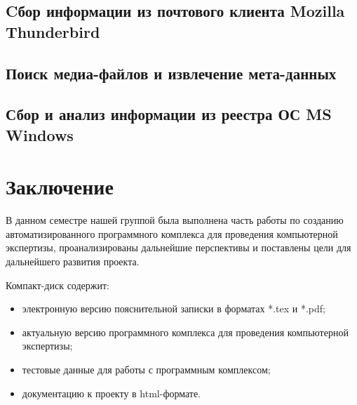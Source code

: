 \newpage
\subsection{Cбор информации из почтового клиента Mozilla Thunderbird}  %


\newpage
\subsection{Поиск медиа-файлов и извлечение мета-данных} %


\newpage 
\subsection{Сбор и анализ информации из реестра ОС MS Windows} %


\newpage
\section*{Заключение}
В данном семестре нашей группой была выполнена часть работы по созданию автоматизированного программного комплекса для проведения компьютерной экспертизы, проанализированы дальнейшие перспективы и поставлены цели для дальнейшего развития проекта.
 
 
 \newpage
 \renewcommand{\refname}{Список использованных источников}
 

 Компакт-диск содержит: 
 \begin{itemize}
 \item электронную версию пояснительной записки в форматах *.tex и *.pdf;
 \item актуальную версию программного комплекса для проведения компьютерной экспертизы;
 \item тестовые данные для работы с программным комплексом;
 \item документацию к проекту в html-формате.
 \end{itemize}
 

